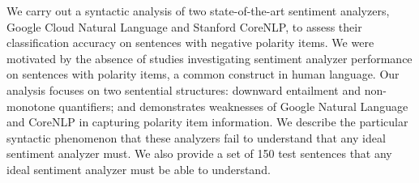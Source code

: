 We carry out a syntactic analysis of two state-of-the-art sentiment analyzers, Google Cloud Natural Language and Stanford CoreNLP, to assess their classification accuracy on sentences with negative polarity items. We were motivated by the absence of studies investigating sentiment analyzer performance on sentences with polarity items, a common construct in human language. Our analysis focuses on two sentential structures: downward entailment and non-monotone quantifiers; and demonstrates weaknesses of Google Natural Language and CoreNLP in capturing polarity item information. We describe the particular syntactic phenomenon that these analyzers fail to understand that any ideal sentiment analyzer must. We also provide a set of 150 test sentences that any ideal sentiment analyzer must be able to understand.
